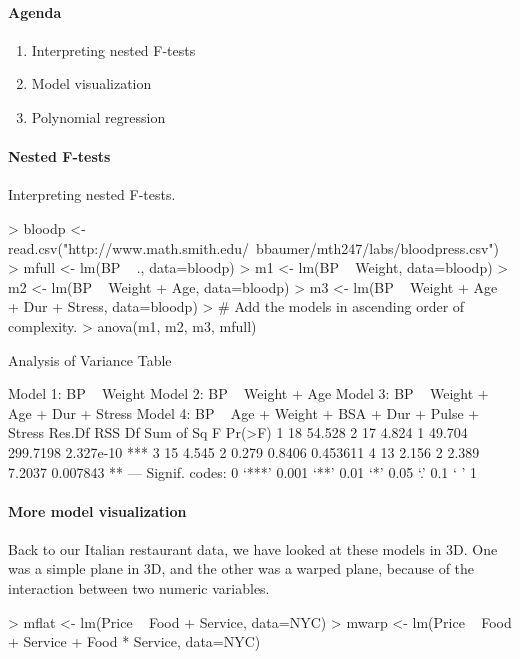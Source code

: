 \documentclass[10pt]{article}
\begin{document}


\paragraph{Agenda}
\begin{enumerate}
  \item Interpreting nested F-tests
  \item Model visualization
  \item Polynomial regression
\end{enumerate}


\paragraph{Nested F-tests}
Interpreting nested F-tests.
\begin{Schunk}
\begin{Sinput}
> bloodp <- read.csv("http://www.math.smith.edu/~bbaumer/mth247/labs/bloodpress.csv")
> mfull <- lm(BP ~ ., data=bloodp)
> m1 <- lm(BP ~ Weight, data=bloodp)
> m2 <- lm(BP ~ Weight +  Age, data=bloodp)
> m3 <- lm(BP ~ Weight +  Age + Dur + Stress, data=bloodp)
> # Add the models in ascending order of complexity.
> anova(m1, m2, m3, mfull)
\end{Sinput}
\begin{Soutput}
Analysis of Variance Table

Model 1: BP ~ Weight
Model 2: BP ~ Weight + Age
Model 3: BP ~ Weight + Age + Dur + Stress
Model 4: BP ~ Age + Weight + BSA + Dur + Pulse + Stress
  Res.Df    RSS Df Sum of Sq        F    Pr(>F)    
1     18 54.528                                    
2     17  4.824  1    49.704 299.7198 2.327e-10 ***
3     15  4.545  2     0.279   0.8406  0.453611    
4     13  2.156  2     2.389   7.2037  0.007843 ** 
---
Signif. codes:  0 ‘***’ 0.001 ‘**’ 0.01 ‘*’ 0.05 ‘.’ 0.1 ‘ ’ 1
\end{Soutput}
\end{Schunk}

\paragraph{More model visualization}
Back to our Italian restaurant data, we have looked at these models in 3D. One was a simple plane in 3D, and the other was a warped plane, because of the interaction between two numeric variables.


\begin{Schunk}
\begin{Sinput}
> mflat <- lm(Price ~ Food + Service, data=NYC)
> mwarp <- lm(Price ~ Food + Service + Food * Service, data=NYC)
\end{Sinput}
\end{Schunk}
\end{document}
